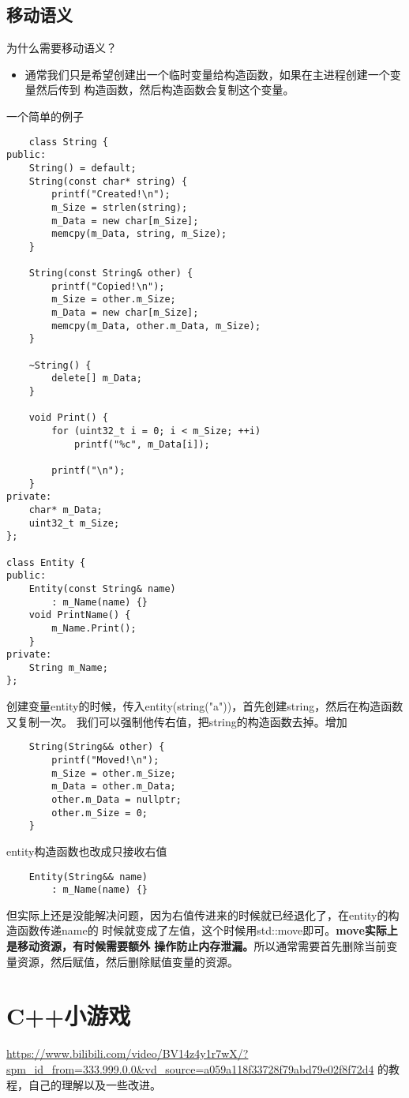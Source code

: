 \documentclass{article}
\begin{document}
\begin{sloppypar}
\subsection{移动语义}
为什么需要移动语义？
\begin{itemize}
	\item 通常我们只是希望创建出一个临时变量给构造函数，如果在主进程创建一个变量然后传到
	构造函数，然后构造函数会复制这个变量。
\end{itemize}
一个简单的例子
\begin{lstlisting}
	class String {
public:
    String() = default;
    String(const char* string) {
        printf("Created!\n");
        m_Size = strlen(string);
        m_Data = new char[m_Size];
        memcpy(m_Data, string, m_Size);
    }
 
    String(const String& other) {
        printf("Copied!\n");
        m_Size = other.m_Size;
        m_Data = new char[m_Size];
        memcpy(m_Data, other.m_Data, m_Size);
    }
 
    ~String() {
        delete[] m_Data;
    }
 
    void Print() {
        for (uint32_t i = 0; i < m_Size; ++i)
            printf("%c", m_Data[i]);
 
        printf("\n");
    }
private:
    char* m_Data;
    uint32_t m_Size;
};
 
class Entity {
public:
    Entity(const String& name)
        : m_Name(name) {}
    void PrintName() {
        m_Name.Print();
    }
private:
    String m_Name;
};
\end{lstlisting}
创建变量entity的时候，传入entity(string("a"))，首先创建string，然后在构造函数又复制一次。
我们可以强制他传右值，把string的构造函数去掉。增加
\begin{lstlisting}
    String(String&& other) {
        printf("Moved!\n");
        m_Size = other.m_Size;
        m_Data = other.m_Data;
        other.m_Data = nullptr;
        other.m_Size = 0;
    }
\end{lstlisting}
entity构造函数也改成只接收右值
\begin{lstlisting}
    Entity(String&& name)
        : m_Name(name) {}
\end{lstlisting}
但实际上还是没能解决问题，因为右值传进来的时候就已经退化了，在entity的构造函数传递name的
时候就变成了左值，这个时候用std::move即可。\textbf{move实际上是移动资源，有时候需要额外
操作防止内存泄漏。}所以通常需要首先删除当前变量资源，然后赋值，然后删除赋值变量的资源。

\section{C++小游戏}
\url{https://www.bilibili.com/video/BV14z4y1r7wX/?spm_id_from=333.999.0.0&vd_source=a059a118f33728f79abd79e02f8f72d4}
的教程，自己的理解以及一些改进。


\end{sloppypar}
\end{document}
